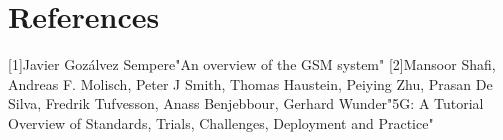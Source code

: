 \documentclass{article}
\begin{document}
\section{References}
[1]Javier Gozálvez Sempere"An overview of the GSM system"
[2]Mansoor Shafi, Andreas F. Molisch, Peter J Smith, Thomas Haustein, Peiying Zhu, Prasan De Silva, Fredrik
Tufvesson, Anass Benjebbour, Gerhard Wunder"5G: A Tutorial Overview of Standards, Trials,
Challenges, Deployment and Practice"
\end{document}
